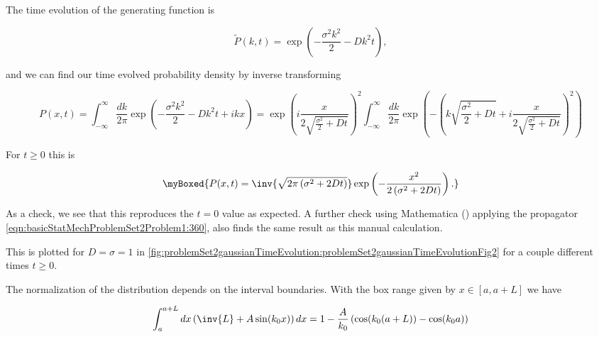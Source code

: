 {The time evolution of the generating function is

\begin{dmath}\label{eqn:basicStatMechProblemSet2Problem1:300}
\tilde{P}(k, t)
=
\exp\left(
-\frac{\sigma^2 k^2}{2} - D k^2 t
\right),
\end{dmath}

and we can find our time evolved probability density by inverse transforming

\begin{dmath}\label{eqn:basicStatMechProblemSet2Problem1:320}
P(x, t)
=
\int_{-\infty}^\infty \frac{dk}{2 \pi}
\exp\left(
-\frac{\sigma^2 k^2}{2} - D k^2 t + i k x
\right)
=
\exp\left(
i \frac{x}{ 2 \sqrt{\frac{\sigma^2}{2} + D t} }
\right)^2
\int_{-\infty}^\infty \frac{dk}{2 \pi}
\exp\left(
-\left(
k \sqrt{\frac{\sigma^2}{2} + D t}
+ i \frac{x}{ 2
\sqrt{\frac{\sigma^2}{2} + D t}
}
\right)^2
\right)
\end{dmath}

For $t \ge 0$ this is

\begin{equation}\label{eqn:basicStatMechProblemSet2Problem1:340}
\myBoxed
{
P(x, t)
=
\inv{\sqrt{2 \pi \left( \sigma^2 + 2 D t \right) } }
\exp\left(
-\frac{x^2}{2 \left( \sigma^2 + 2 D t \right) }
\right).
}
\end{equation}

As a check, we see that this reproduces the $t = 0$ value as expected.  A further check using Mathematica () applying the propagator \ref{eqn:basicStatMechProblemSet2Problem1:360}, also finds the same result as this manual calculation.

This is plotted for $D = \sigma = 1$ in \cref{fig:problemSet2gaussianTimeEvolution:problemSet2gaussianTimeEvolutionFig2} for a couple different times $t \ge 0$.



The normalization of the distribution depends on the interval boundaries.  With the box range given by $x \in [a, a + L]$ we have

\begin{equation}\label{eqn:basicStatMechProblemSet2Problem1:380}
\int_a^{a + L} dx \left( \inv{L} + A \sin( k_0 x) \right) dx
=
1 - \frac{A}{k_0} \left( \cos( k_0(a + L) ) - \cos( k_0 a ) \right)
\end{equation}

}
